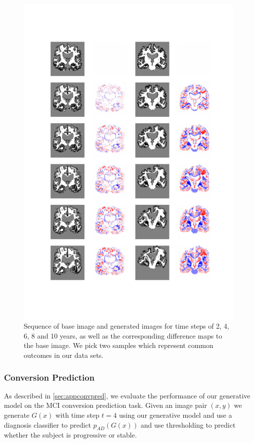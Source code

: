\begin{figure}
	\centering
	\includegraphics[width=0.9\linewidth, trim={70 70 50 100}, clip]{images/age_plots/longterm_diff}
	\vspace*{-15pt}
	\caption{Sequence of base image and generated images for time steps of 2, 4, 6, 8 and 10 years, as well as the corresponding difference maps to the base image. We pick two samples which represent common outcomes in our data sets.}
	\label{fig:hcad_ad} %
\end{figure}

\subsubsection*{Conversion Prediction}
As described in \autoref{sec:appconvpred}, we evaluate the performance of our generative model on the MCI conversion prediction task. Given an image pair $(x, y)$ we generate $G(x)$ with time step $t = 4$ using our generative model and use a diagnosis classifier to predict $p_{AD}(G(x))$ and use thresholding to predict whether the subject is progressive or stable.

